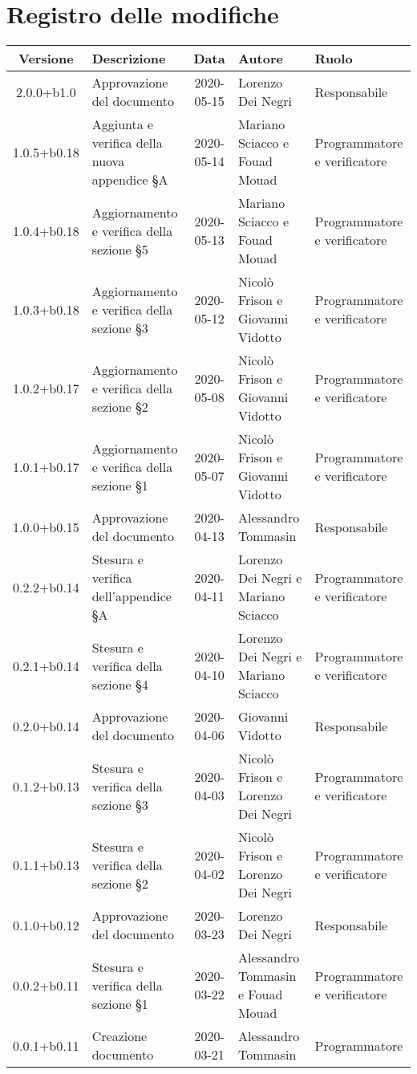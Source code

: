 \section*{Registro delle modifiche}

\begin{center}
	\begin{longtable}{|c|p{3.5cm}|c|p{3cm}|p{3cm}|}
	\hline
	\rowcolor{lighter-grayer}
	\textbf{Versione} & \textbf{Descrizione} & \textbf{Data} & \textbf{Autore} & \textbf{Ruolo} \\
	\hline
	\endfirsthead
	2.0.0+b1.0 & Approvazione del documento & 2020-05-15 & Lorenzo Dei Negri & Responsabile \\
	\hline
	1.0.5+b0.18 & Aggiunta e verifica della nuova appendice \S A & 2020-05-14 & Mariano Sciacco e Fouad Mouad & Programmatore e verificatore \\
	\hline
	1.0.4+b0.18 & Aggiornamento e verifica della sezione \S5 & 2020-05-13 & Mariano Sciacco e Fouad Mouad & Programmatore e verificatore \\
	\hline
	1.0.3+b0.18 & Aggiornamento e verifica della sezione \S3 & 2020-05-12 & Nicolò Frison e Giovanni Vidotto & Programmatore e verificatore \\
	\hline
	1.0.2+b0.17 & Aggiornamento e verifica della sezione \S2 & 2020-05-08 & Nicolò Frison e Giovanni Vidotto & Programmatore e verificatore \\
	\hline
	1.0.1+b0.17 & Aggiornamento e verifica della sezione \S1 & 2020-05-07 & Nicolò Frison e Giovanni Vidotto & Programmatore e verificatore \\
	1.0.0+b0.15 & Approvazione del documento & 2020-04-13 & Alessandro Tommasin & Responsabile \\
	\hline
	0.2.2+b0.14 & Stesura e verifica dell'appendice \S A & 2020-04-11 & Lorenzo Dei Negri e Mariano Sciacco & Programmatore e verificatore \\
	\hline
	0.2.1+b0.14 & Stesura e verifica della sezione \S4 & 2020-04-10 & Lorenzo Dei Negri e Mariano Sciacco & Programmatore e verificatore \\
	\hline
	0.2.0+b0.14 & Approvazione del documento & 2020-04-06 & Giovanni Vidotto & Responsabile \\
	\hline
	0.1.2+b0.13 & Stesura e verifica della sezione \S3 & 2020-04-03 & Nicolò Frison e Lorenzo Dei Negri & Programmatore e verificatore \\
	\hline
	0.1.1+b0.13 & Stesura e verifica della sezione \S2 & 2020-04-02 & Nicolò Frison e Lorenzo Dei Negri & Programmatore e verificatore \\
	\hline
	0.1.0+b0.12 & Approvazione del documento & 2020-03-23 & Lorenzo Dei Negri & Responsabile \\
	\hline
	0.0.2+b0.11 & Stesura e verifica della sezione \S1 & 2020-03-22 & Alessandro Tommasin e Fouad Mouad & Programmatore e verificatore \\
	\hline
	0.0.1+b0.11 & Creazione documento & 2020-03-21 & Alessandro Tommasin & Programmatore \\
	\hline
	\hline
	\end{longtable}
\end{center}
